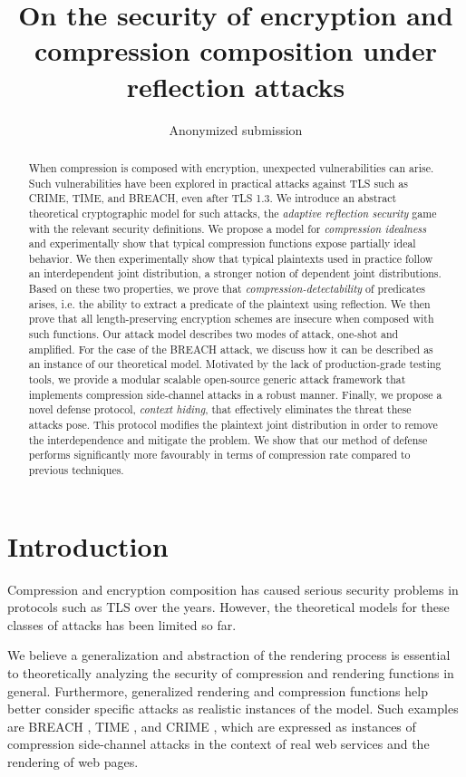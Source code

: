 \documentclass[conference, letterpaper, 10pt]{IEEEtran}
\title{On the security of encryption and compression composition under reflection attacks}
\author{
    Anonymized submission
}
\begin{document}
\maketitle

\begin{abstract}
When compression is composed with encryption, unexpected vulnerabilities can
arise. Such vulnerabilities have been explored in practical attacks against TLS
such as CRIME, TIME, and BREACH, even after TLS 1.3. We introduce an abstract
theoretical cryptographic model for such attacks, the \textit{adaptive
reflection security} game with the relevant security definitions. We propose a
model for \textit{compression idealness} and experimentally show that typical compression
functions expose partially ideal behavior. We then experimentally show that
typical plaintexts used in practice follow an interdependent joint distribution,
a stronger notion of dependent joint distributions. Based on these two
properties, we prove that \textit{compression-detectability} of predicates
arises, i.e. the ability to extract a predicate of the plaintext using reflection.
We then prove that all length-preserving encryption schemes are insecure when
composed with such functions. Our attack model describes two modes of attack,
one-shot and amplified. For the case of the BREACH attack, we discuss how it can
be described as an instance of our theoretical model. Motivated by the lack of
production-grade testing tools, we provide a modular scalable open-source
generic attack framework that implements compression side-channel attacks in a
robust manner. Finally, we propose a novel defense protocol, \textit{context
hiding}, that effectively eliminates the threat these attacks pose. This
protocol modifies the plaintext joint distribution in order to remove the
interdependence and mitigate the problem. We show that our method of
defense performs significantly more favourably in terms of compression rate
compared to previous techniques.
\end{abstract}

\section{Introduction}\label{sec:prev}

Compression and encryption composition has caused serious security problems
in protocols such as TLS \cite{c15} over the years.
However, the theoretical models for these classes of attacks has been limited so
far.

We believe a generalization and abstraction of the rendering process is
essential to theoretically analyzing the security of compression and rendering
functions in general. Furthermore, generalized rendering and compression
functions help better consider specific attacks as realistic instances of the
model. Such examples are BREACH \cite{c3}, TIME \cite{c2}, and CRIME \cite{c1}, which are expressed as
instances of compression side-channel attacks in the context of real web
services and the rendering of web pages.
\end{document}
